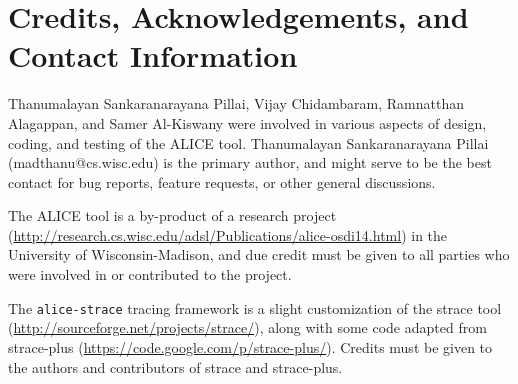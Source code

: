 \documentclass[oneside]{memoir}
\begin{document}
\chapter{Credits, Acknowledgements, and Contact Information}

Thanumalayan Sankaranarayana Pillai, Vijay Chidambaram, Ramnatthan Alagappan, and Samer Al-Kiswany were involved in various aspects of design, coding, and testing of the ALICE tool. Thanumalayan Sankaranarayana Pillai (madthanu@cs.wisc.edu) is the primary author, and might serve to be the best contact for bug reports, feature requests, or other general discussions.

The ALICE tool is a by-product of a research project (\url{http://research.cs.wisc.edu/adsl/Publications/alice-osdi14.html}) in the University of Wisconsin-Madison, and due credit must be given to all parties who were involved in or contributed to the project.

The \verb;alice-strace; tracing framework is a slight customization of the strace tool (\url{http://sourceforge.net/projects/strace/}), along with some code adapted from strace-plus (\url{https://code.google.com/p/strace-plus/}). Credits must be given to the authors and contributors of strace and strace-plus.
\end{document}
